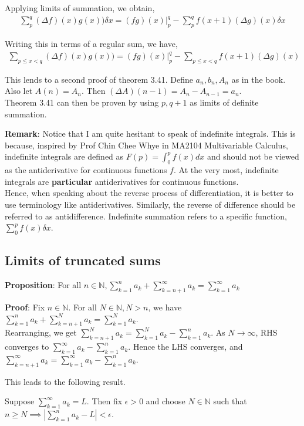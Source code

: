 \documentclass{article}
\begin{document}
Applying limits of summation, we obtain,
\begin{align*}
	\sum_p^q (\Delta f)(x)g(x)) \delta x = (fg)(x)|_p^q - \sum_p^q f(x+1)(\Delta g)(x) \delta x
\end{align*}

Writing this in terms of a regular sum, we have,
\begin{align*}
	\sum_{p\leq x < q} (\Delta f)(x)g(x)) = (fg)(x)|_p^q - \sum_{p\leq x < q} f(x+1)(\Delta g)(x)
\end{align*}

This lends to a second proof of theorem 3.41.
Define $a_n,b_n,A_n$ as in the book. Also let $A(n) = A_n$. Then $(\Delta A)(n-1) = A_n - A_{n-1} = a_n$.\\
Theorem 3.41 can then be proven by using $p, q+1$ as limits of definite summation.

\textbf{Remark}: Notice that I am quite hesitant to speak of indefinite integrals. This is because, inspired by Prof Chin Chee Whye in MA2104 Multivariable Calculus, indefinite integrals are defined as $F(p)=\int_0^pf(x)dx$ and should not be viewed as the antiderivative for continuous functions $f$. At the very most, indefinite integrals are \textbf{particular} antiderivatives for continuous functions.\\
Hence, when speaking about the reverse process of differentiation, it is better to use terminology like antiderivatives. Similarly, the reverse of difference should be referred to as antidifference. Indefinite summation refers to a specific function, $\sum_0^p f(x)\delta x$.

\subsection{Limits of truncated sums}
\textbf{Proposition}: For all $n\in \mathbb{N}, \sum_{k=1}^na_k+\sum_{k=n+1}^\infty a_k=\sum_{k=1}^\infty a_k$

\textbf{Proof}: Fix $n\in \mathbb{N}$. For all $N\in \mathbb{N}, N>n$, we have $\sum_{k=1}^na_k+\sum_{k=n+1}^N a_k=\sum_{k=1}^N a_k$.\\
Rearranging, we get $\sum_{k=n+1}^N a_k=\sum_{k=1}^N a_k-\sum_{k=1}^na_k$. As $N\rightarrow \infty$, RHS converges to $\sum_{k=1}^\infty a_k-\sum_{k=1}^na_k$. Hence the LHS converges, and $\sum_{k=n+1}^\infty a_k=\sum_{k=1}^\infty a_k-\sum_{k=1}^na_k$.

This leads to the following result. 

Suppose $\sum_{k=1}^\infty a_k=L$. Then fix $\epsilon >0$ and choose $N\in \mathbb{N}$ such that $n\geq N\implies |\sum_{k=1}^{n}a_k - L|<\epsilon$.
\end{document}

